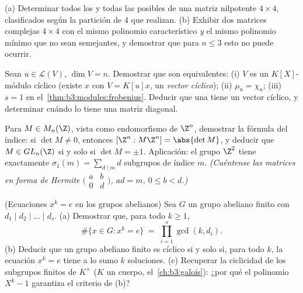 \begin{exercise}[$\star\star$]\label{exo:b3:modules:8}
(a) Determinar todos los  y todas las  posibles de una matriz nilpotente $4 \times 4$, clasificados
según la partición de $4$ que realizan. (b) Exhibir dos matrices
complejas $4\times4$ con el mismo polinomio característico \emph{y} el
mismo polinomio mínimo que no sean semejantes, y demostrar que para
$n \leq 3$ esto no puede ocurrir.
\end{exercise}

\begin{exercise}[$\star\star\star$]\label{exo:b3:modules:9}
Sean $u \in \mathcal L(V)$, $\dim V = n$. Demostrar que son
equivalentes: (i) $V$ es un $K[X]$-módulo cíclico (existe $x$ con
$V = K[u]x$, un \emph{vector cíclico}); (ii) $\mu_u = \chi_u$; (iii)
$s = 1$ en el~\cref{thm:b3:modules:frobenius}. Deducir que una
 tiene un vector
cíclico, y determinar cuándo lo tiene una matriz diagonal.
\end{exercise}

\begin{exercise}[$\star\star\star$]\label{exo:b3:modules:10}
Para $M \in M_n(\Z)$, vista como endomorfismo de $\Z^n$, demostrar la
fórmula del índice: si $\det M \ne 0$, entonces
$[\Z^n : M\Z^n] = \abs{\det M}$, y deducir que $M \in GL_n(\Z)$ si y
solo si $\det M = \pm 1$. Aplicación: el grupo $\Z^2$ tiene exactamente
$\sigma_1(m) = \sum_{d \mid m} d$ subgrupos de índice $m$.
\emph{(Cuéntense las matrices en forma de Hermite
$\bigl(\begin{smallmatrix}
a & b\\ 0 & d\end{smallmatrix}\bigr)$, $ad = m$, $0 \leq b <
d$.)}
\end{exercise}

\begin{exercise}[$\star\star$]\label{exo:b3:modules:11}
(Ecuaciones $x^k = e$ en los grupos abelianos) Sea $G$ un grupo abeliano
finito con 
$d_1 \mid d_2 \mid \dots
\mid d_s$. (a) Demostrar que, para todo $k \geq 1$,
\[
\#\{x \in G : x^k = e\} \;=\; \prod_{i=1}^{s}\gcd(k, d_i) .
\]
(b) Deducir que un grupo abeliano finito es cíclico si y solo si, para
todo $k$, la ecuación $x^k = e$ tiene a lo sumo $k$ soluciones. (c)
Recuperar la ciclicidad de los subgrupos finitos de $K^\times$ ($K$ un
cuerpo, el~\cref{ch:b3:galois}): ¿por qué el polinomio $X^k - 1$
garantiza el criterio de (b)?
\end{exercise}

